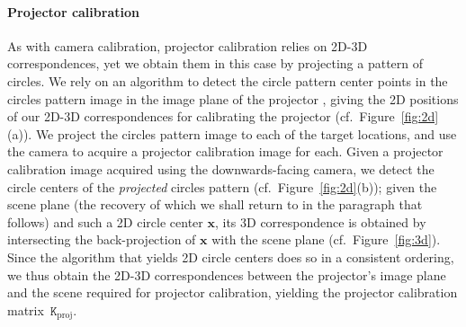 \documentclass[review]{elsarticle}
\begin{document}
\paragraph{Projector calibration} As with camera calibration, projector calibration relies on 2D-3D correspondences, yet we obtain them in this case by projecting a pattern of circles. We rely on an algorithm to detect the circle pattern center points in the circles pattern image in the image plane of the projector \cite{bradski2000opencv}, giving the 2D positions of our 2D-3D correspondences for calibrating the projector (cf.\ Figure~\ref{fig:2d}(a)). We project the circles pattern image to each of the target locations, and use the camera to acquire a projector calibration image for each. Given a projector calibration image acquired using the downwards-facing camera, we detect the circle centers of the \textit{projected} circles pattern (cf.\ Figure~\ref{fig:2d}(b)); given the scene plane (the recovery of which we shall return to in the paragraph that follows) and such a 2D circle center $\mathbf{x}$, its 3D correspondence is obtained by intersecting the back-projection of $\mathbf{x}$ with the scene plane (cf.\ Figure~\ref{fig:3d}). Since the algorithm that yields 2D circle centers does so in a consistent ordering, we thus obtain the 2D-3D correspondences between the projector's image plane and the scene required for projector calibration, yielding the projector calibration matrix~$\mathtt{K}_\text{proj}$.
\end{document}
